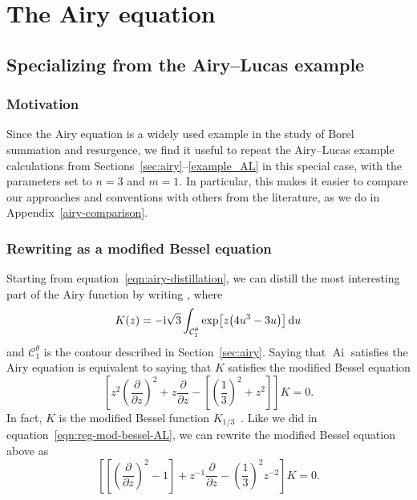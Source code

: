 \documentclass[pdftex]{sigma}
\DeclareMathOperator{\Ai}{Ai}
\numberwithin{equation}{section}
\begin{document}
\appendix

\section{The Airy equation}\label{airy-appendix}
\subsection{Specializing from the Airy--Lucas example}\label{sec:spec-to-airy}
\subsubsection{Motivation}
Since the Airy equation is a widely used example in the study of Borel summation and resurgence, we find it useful to repeat the Airy--Lucas example calculations from Sections~\ref{sec:airy}--\ref{example_AL} in this special case, with the parameters set to $n = 3$ and $m = 1$. In particular, this makes it easier to compare our approaches and conventions with others from the literature, as we do in Appendix~\ref{airy-comparison}.

\subsubsection{Rewriting as a modified Bessel equation}
Starting from equation~\eqref{eqn:airy-distillation}, we can distill the most interesting part of the Airy function by writing
\smash{$\Ai(y) = -\frac{1}{\pi\sqrt{3}} y^{1/2} K\big(\frac{2}{3} y^{3/2}\big)$},
where
\begin{equation}\label{integral:mod-bessel-airy}
K(z) = -{\rm i}\sqrt{3} \int_{\mathcal{C}^\theta_1} \exp\bigl[z \bigl(4u^3 - 3u\bigr)\bigr]\, {\rm d}u
\end{equation}
and $\mathcal{C}^\theta_1$ is the contour described in Section~\ref{sec:airy}. Saying that $\Ai$ satisfies the Airy equation is equivalent to saying that $K$ satisfies the modified Bessel equation
\[%
\left[z^2 \left(\frac{\partial}{\partial z}\right)^2 + z \frac{\partial}{\partial z} - \left[\left(\frac{1}{3}\right)^2 + z^2\right]\right] K = 0.
\]
In fact, $K$ is the modified Bessel function $K_{1/3}$~\cite[equation~(9.6.1)]{dlmf}. Like we did in equation~\eqref{eqn:reg-mod-bessel-AL}, we can rewrite the modified Bessel equation above as
\begin{equation}\label{eqn:reg-mod-bessel}
\left[ \left[ \left(\frac{\partial}{\partial z}\right)^2 - 1 \right] + z^{-1} \frac{\partial}{\partial z} - \left(\frac{1}{3}\right)^2 z^{-2} \right] K = 0.
\end{equation}
%
\end{document}
